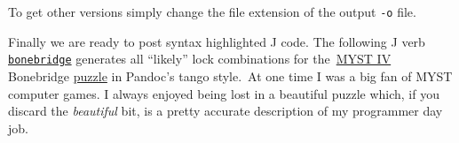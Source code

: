 \noindent To get other versions simply change the file extension of the output
\texttt{-o} file.


Finally we are ready to post syntax highlighted J code. The following J
verb \href{https://github.com/bakerjd99/jacks/blob/master/jodliterate/bonebridge.ijs}{\texttt{bonebridge}} generates 
all ``likely'' lock combinations for
the~\href{http://en.wikipedia.org/wiki/Myst\_IV:\_Revelation}{MYST IV}
Bonebridge
\href{http://www.fisicx.com/revelation/walkthrough.htm}{puzzle} in
Pandoc's tango style.~At one time I was a big fan of MYST computer
games. I always enjoyed being lost in a beautiful puzzle which, if you
discard the \emph{beautiful} bit, is a pretty accurate description of my
programmer day job.

